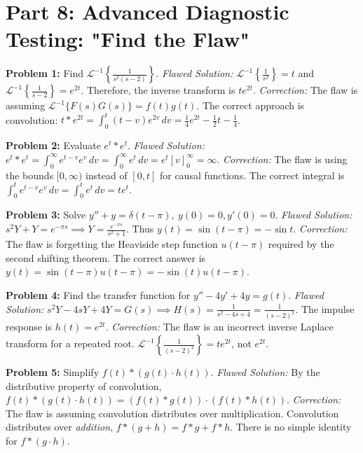 \documentclass[11pt, letterpaper]{article}
\theoremstyle{definition}
\theoremstyle{remark}
\begin{document}
\section{Part 8: Advanced Diagnostic Testing: "Find the Flaw"}

\textbf{Problem 1:} Find $\mathscr{L}^{-1}\left\{\frac{1}{s^2(s-2)}\right\}$.
\textit{Flawed Solution:} $\mathscr{L}^{-1}\left\{\frac{1}{s^2}\right\} = t$ and $\mathscr{L}^{-1}\left\{\frac{1}{s-2}\right\} = e^{2t}$. Therefore, the inverse transform is $t e^{2t}$.
\textit{Correction:} The flaw is assuming $\mathscr{L}^{-1}\{F(s)G(s)\} = f(t)g(t)$. The correct approach is convolution: $t * e^{2t} = \int_0^t (t-v)e^{2v} \, dv = \frac{1}{4}e^{2t} - \frac{1}{2}t - \frac{1}{4}$.

\textbf{Problem 2:} Evaluate $e^t * e^t$.
\textit{Flawed Solution:} $e^t * e^t = \int_0^\infty e^{t-v}e^v \, dv = \int_0^\infty e^t \, dv = e^t[v]_0^\infty = \infty$.
\textit{Correction:} The flaw is using the bounds $[0, \infty)$ instead of $[0, t]$ for causal functions. The correct integral is $\int_0^t e^{t-v}e^v \, dv = \int_0^t e^t \, dv = t e^t$.

\textbf{Problem 3:} Solve $y'' + y = \delta(t-\pi), \ y(0)=0, y'(0)=0$.
\textit{Flawed Solution:} $s^2Y + Y = e^{-\pi s} \implies Y = \frac{e^{-\pi s}}{s^2+1}$. Thus $y(t) = \sin(t-\pi) = -\sin t$.
\textit{Correction:} The flaw is forgetting the Heaviside step function $u(t-\pi)$ required by the second shifting theorem. The correct answer is $y(t) = \sin(t-\pi)u(t-\pi) = -\sin(t)u(t-\pi)$.

\textbf{Problem 4:} Find the transfer function for $y'' - 4y' + 4y = g(t)$.
\textit{Flawed Solution:} $s^2Y - 4sY + 4Y = G(s) \implies H(s) = \frac{1}{s^2-4s+4} = \frac{1}{(s-2)^2}$. The impulse response is $h(t) = e^{2t}$.
\textit{Correction:} The flaw is an incorrect inverse Laplace transform for a repeated root. $\mathscr{L}^{-1}\left\{\frac{1}{(s-2)^2}\right\} = t e^{2t}$, not $e^{2t}$.

\textbf{Problem 5:} Simplify $f(t) * (g(t) \cdot h(t))$.
\textit{Flawed Solution:} By the distributive property of convolution, $f(t) * (g(t) \cdot h(t)) = (f(t) * g(t)) \cdot (f(t) * h(t))$.
\textit{Correction:} The flaw is assuming convolution distributes over multiplication. Convolution distributes over \textit{addition}, $f * (g + h) = f*g + f*h$. There is no simple identity for $f * (g \cdot h)$.
\end{document}
